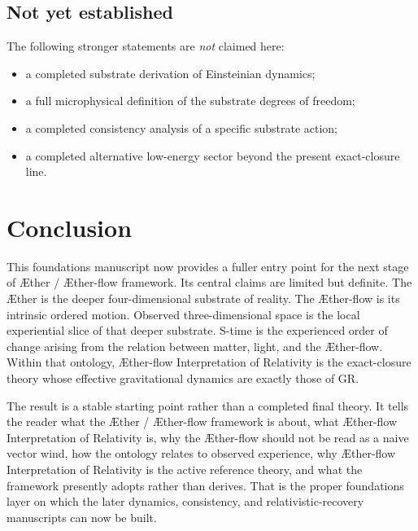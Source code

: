 \documentclass[11pt]{article}
\newcommand{\Aether}{\AE{}ther}
\newcommand{\Aflow}{\AE{}ther-flow}
\newcommand{\TheoryName}{\Aflow{} Interpretation of Relativity}
\newcommand{\TheoryProgram}{\Aether{} / \Aflow{} framework}
\begin{document}
\subsection{Not yet established}

The following stronger statements are \emph{not} claimed here:
\begin{itemize}
    \item a completed substrate derivation of Einsteinian dynamics;
    \item a full microphysical definition of the substrate degrees of freedom;
    \item a completed consistency analysis of a specific substrate action;
    \item a completed alternative low-energy sector beyond the present exact-closure line.
\end{itemize}

\section{Conclusion}

This foundations manuscript now provides a fuller entry point for the next stage of \TheoryProgram{}. Its central claims are limited but definite. The \Aether{} is the deeper four-dimensional substrate of reality. The \Aflow{} is its intrinsic ordered motion. Observed three-dimensional space is the local experiential slice of that deeper substrate. S-time is the experienced order of change arising from the relation between matter, light, and the \Aflow{}. Within that ontology, \TheoryName{} is the exact-closure theory whose effective gravitational dynamics are exactly those of GR.

The result is a stable starting point rather than a completed final theory. It tells the reader what the \TheoryProgram{} is about, what \TheoryName{} is, why the \Aflow{} should not be read as a naive vector wind, how the ontology relates to observed experience, why \TheoryName{} is the active reference theory, and what the framework presently adopts rather than derives. That is the proper foundations layer on which the later dynamics, consistency, and relativistic-recovery manuscripts can now be built.
\end{document}
